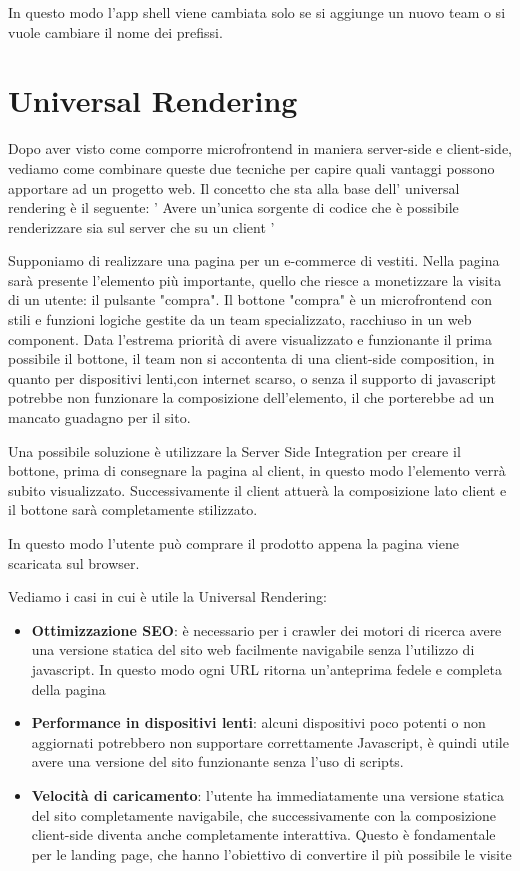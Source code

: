 In questo modo l'app shell viene cambiata solo se si aggiunge un nuovo team o si vuole cambiare il nome dei prefissi.



\pagebreak
\section{Universal Rendering}
Dopo aver visto come comporre microfrontend in maniera server-side e client-side, vediamo come combinare queste due tecniche
per capire quali vantaggi possono apportare ad un progetto web.
Il concetto che sta alla base dell' universal rendering è il seguente:
' Avere un'unica sorgente di codice che è possibile renderizzare sia sul server che su un client ' \cite{ssr}

Supponiamo di realizzare una pagina per un e-commerce di vestiti.
Nella pagina sarà presente l'elemento più importante, quello che riesce a monetizzare la visita di un utente: il pulsante "compra".
Il bottone "compra" è un microfrontend con stili e funzioni logiche gestite da un team specializzato, racchiuso in un web component.
Data l'estrema priorità di avere visualizzato e funzionante il prima possibile il bottone, il team non si accontenta di una client-side composition,
in quanto per dispositivi lenti,con internet scarso, o senza il supporto di javascript potrebbe non funzionare la composizione dell'elemento, 
il che porterebbe ad un mancato guadagno per il sito.

Una possibile soluzione è utilizzare la Server Side Integration per creare il bottone, prima di consegnare la pagina al client, in questo modo l'elemento 
verrà subito visualizzato. Successivamente il client attuerà la composizione lato client e il bottone sarà completamente stilizzato.

In questo modo l'utente può comprare il prodotto appena la pagina viene scaricata sul browser.

Vediamo i casi in cui è utile la Universal Rendering: \cite{angularUniversal}
\begin{itemize}
    \item \textbf{Ottimizzazione SEO}: è necessario per i crawler dei motori di ricerca avere una versione statica del sito web
    facilmente navigabile senza l'utilizzo di javascript. In questo modo ogni URL ritorna un'anteprima fedele e completa della pagina
    \item \textbf{Performance in dispositivi lenti}: alcuni dispositivi poco potenti o non aggiornati potrebbero non supportare correttamente
    Javascript, è quindi utile avere una versione del sito funzionante senza l'uso di scripts.
    \item \textbf{Velocità di caricamento}: l'utente ha immediatamente una versione statica del sito completamente navigabile, che successivamente
    con la composizione client-side diventa anche completamente interattiva. Questo è fondamentale per le landing page, che hanno l'obiettivo di convertire il più 
    possibile le visite
\end{itemize}


